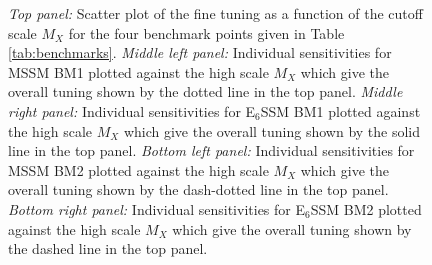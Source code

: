 \documentclass[preprint,amsmath,amssymb,aps,superscriptaddress,prd,showpacs,floatfix,nofootinbib]{revtex4-1}
\begin{document}
\begin{figure}
\begin{center}
\caption{\textit{Top panel:} Scatter plot of the fine tuning as a function of the cutoff scale $M_X$ for the four benchmark points given in Table \ref{tab:benchmarks}. \textit{Middle left panel:}  Individual sensitivities for MSSM BM1 plotted against the high scale $M_X$ which give the overall tuning shown by the dotted line in the top panel. \textit{Middle right panel:} Individual sensitivities for E$_6$SSM BM1 plotted against the high scale $M_X$ which give the overall tuning shown by the solid line in the top panel. \textit{Bottom left panel:} Individual sensitivities for MSSM BM2 plotted against the high scale $M_X$ which give the overall tuning shown by the dash-dotted line in the top panel. \textit{Bottom right panel:} Individual sensitivities for E$_6$SSM BM2 plotted against the high scale $M_X$ which give the overall tuning shown by the dashed line in the top panel.    }
\label{Fig:BMs-varyMX}
\end{center}
\end{figure}
\end{document}
